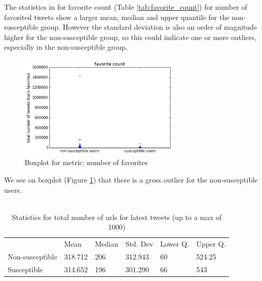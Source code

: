 \documentclass[10pt]{IEEEtran}
\begin{document}
The statistics in for favorite count (Table \ref{tab:favorite_count}) for number of favorited tweets show a larger mean, median and upper quantile for the non-susceptible group. However the standard deviation is also an order of magnitude higher for the non-susceptible group, so this could indicate one or more outliers, especially in the non-susceptible group.
\begin{figure}[H]
  \centering
  \includegraphics[width=3.0in]{favorite_boxplot}
  \caption{Boxplot for metric: number of favorites}
  \label{fig:favorite_boxplot}
\end{figure}
We see on boxplot (Figure \ref{fig:favorite_boxplot}) that there is a gross outlier for the non-susceptible users.\\\\
\begin{table}[ht!]

\begin{tabular}{llllll}
\textbf{}       & Mean    & Median & Std. Dev & Lower Q. & Upper Q. \\
Non-susceptible & 318.712 & 206    & 312.943  & 60       &  524.25  \\
Susceptible     & 314.652 & 196    & 301.290  & 66       &   543  
\end{tabular}
\caption{Statistics for total number of urls for latest tweets (up to a max of 1000)}
\label{tab:urls}
\end{table}
\end{document}
